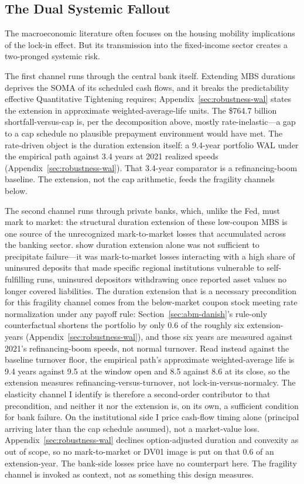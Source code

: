 \documentclass[12pt]{article}
\begin{document}
\subsection{The Dual Systemic Fallout}\label{sec:discussion-fallout}

The macroeconomic literature often focuses on the housing mobility implications of the lock-in effect. But its transmission into the fixed-income sector creates a two-pronged systemic risk.

The first channel runs through the central bank itself. Extending MBS durations deprives the SOMA of its scheduled cash flows, and it breaks the predictability effective Quantitative Tightening requires; Appendix~\ref{sec:robustness-wal} states the extension in approximate weighted-average-life units. The \$764.7 billion shortfall-versus-cap is, per the decomposition above, mostly rate-inelastic---a gap to a cap schedule no plausible prepayment environment would have met. The rate-driven object is the duration extension itself: a 9.4-year portfolio WAL under the empirical path against 3.4 years at 2021 realized speeds (Appendix~\ref{sec:robustness-wal}). That 3.4-year comparator is a refinancing-boom baseline. The extension, not the cap arithmetic, feeds the fragility channels below.

The second channel runs through private banks, which, unlike the Fed, must mark to market: the structural duration extension of these low-coupon MBS is one source of the unrecognized mark-to-market losses that accumulated across the banking sector. \citet{jiang2023} show duration extension alone was not sufficient to precipitate failure---it was mark-to-market losses interacting with a high share of uninsured deposits that made specific regional institutions vulnerable to self-fulfilling runs, uninsured depositors withdrawing once reported asset values no longer covered liabilities. The duration extension that is a necessary precondition for this fragility channel comes from the below-market coupon stock meeting rate normalization under any payoff rule: Section~\ref{sec:abm-danish}'s rule-only counterfactual shortens the portfolio by only 0.6 of the roughly six extension-years (Appendix~\ref{sec:robustness-wal}), and those six years are measured against 2021's refinancing-boom speeds, not normal turnover. Read instead against the baseline turnover floor, the empirical path's approximate weighted-average life is 9.4 years against 9.5 at the window open and 8.5 against 8.6 at its close, so the extension measures refinancing-versus-turnover, not lock-in-versus-normalcy. The elasticity channel I identify is therefore a second-order contributor to that precondition, and neither it nor the extension is, on its own, a sufficient condition for bank failure. On the institutional side I price cash-flow timing alone (principal arriving later than the cap schedule assumed), not a market-value loss. Appendix~\ref{sec:robustness-wal} declines option-adjusted duration and convexity as out of scope, so no mark-to-market or DV01 image is put on that 0.6 of an extension-year. The bank-side losses \citet{jiang2023} price have no counterpart here. The fragility channel is invoked as context, not as something this design measures.
\end{document}
